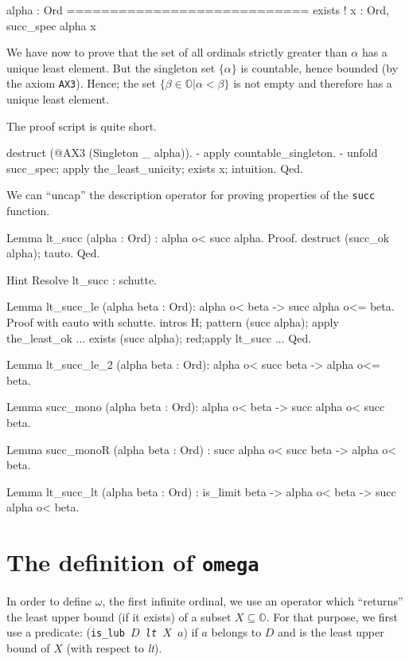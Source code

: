 {\begin{Coqanswer}
  alpha : Ord
  ============================
  exists ! x : Ord, succ_spec alpha x
\end{Coqanswer}

We have now to prove that the set of all ordinals strictly greater than $\alpha$ has a unique least element. But the singleton set $\{\alpha\}$ is countable, hence  bounded (by the axiom \texttt{AX3}). Hence; the set $\{\beta\in\mathbb{O}|\alpha < \beta\}$ is not empty
and therefore has a unique least element.

The \coq{} proof script is quite short.

\begin{Coqsrc}
  destruct (@AX3 (Singleton _ alpha)).
  - apply countable_singleton.
  -  unfold succ_spec; apply the_least_unicity;  exists x; intuition.
Qed.     
\end{Coqsrc}


We can ``uncap'' the description operator for proving properties of the
\texttt{succ} function.

\begin{Coqsrc}
Lemma lt_succ (alpha : Ord) :  alpha o< succ alpha.
Proof.
  destruct  (succ_ok  alpha);  tauto.
Qed.

Hint Resolve lt_succ : schutte.

Lemma lt_succ_le (alpha beta : Ord):
  alpha o< beta -> succ alpha o<= beta.
Proof with eauto with schutte.
  intros  H;  pattern (succ alpha); apply the_least_ok ... 
  exists (succ alpha); red;apply lt_succ ...
Qed.
\end{Coqsrc}


\begin{Coqsrc}
Lemma lt_succ_le_2 (alpha beta : Ord):
  alpha o< succ beta -> alpha o<= beta.

Lemma succ_mono (alpha beta : Ord):
  alpha o< beta -> succ alpha o< succ beta.

Lemma succ_monoR (alpha beta : Ord) :
 succ alpha o< succ beta -> alpha o< beta.

Lemma lt_succ_lt (alpha beta : Ord) :
  is_limit beta ->  alpha o< beta -> succ alpha o< beta.
\end{Coqsrc}



\section{The definition of \texttt{omega}}
In order to define $\omega$, the first infinite ordinal, we use an operator which
``returns'' the least upper bound (if it exists) of a subset $X\subseteq \mathbb{O}$.
For that purpose, we first use a predicate:
(\texttt{is\_lub $D$ \textit{lt} $X$ $a$}) if $a$ belongs to $D$ and is the least 
upper bound  of $X$ (with respect to \textit{lt}).


}
